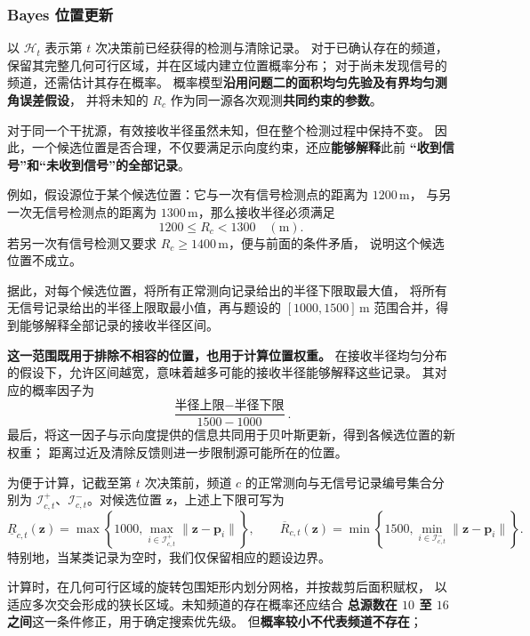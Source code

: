 \documentclass[UTF8,a4paper,12pt]{ctexart}
\begin{document}
\subsubsection{Bayes 位置更新}

以 $\mathcal H_t$ 表示第 $t$ 次决策前已经获得的检测与清除记录。
对于已确认存在的频道，保留其完整几何可行区域，并在区域内建立位置概率分布；
对于尚未发现信号的频道，还需估计其存在概率。
概率模型\textbf{沿用问题二的面积均匀先验及有界均匀测角误差假设}，
并将未知的 $R_c$ 作为同一源各次观测\textbf{共同约束的参数}。

对于同一个干扰源，有效接收半径虽然未知，但在整个检测过程中保持不变。
因此，一个候选位置是否合理，不仅要满足示向度约束，还应\textbf{能够解释}此前
\textbf{“收到信号”和“未收到信号”的全部记录}。

例如，假设源位于某个候选位置：它与一次有信号检测点的距离为 $1200\,\mathrm m$，
与另一次无信号检测点的距离为 $1300\,\mathrm m$，那么接收半径必须满足
\[
  1200\leq R_c<1300\quad (\mathrm m).
\]
若另一次有信号检测又要求 $R_c\geq1400\,\mathrm m$，便与前面的条件矛盾，
说明这个候选位置不成立。

据此，对每个候选位置，将所有正常测向记录给出的半径下限取最大值，
将所有无信号记录给出的半径上限取最小值，再与题设的 $[1000,1500]\,\mathrm m$
范围合并，得到能够解释全部记录的接收半径区间。

\textbf{这一范围既用于排除不相容的位置，也用于计算位置权重。}
在接收半径均匀分布的假设下，允许区间越宽，意味着越多可能的接收半径能够解释这些记录。
其对应的概率因子为
\[
  \frac{\text{半径上限}-\text{半径下限}}{1500-1000}.
\]
最后，将这一因子与示向度提供的信息共同用于贝叶斯更新，得到各候选位置的新权重；
距离过近及清除反馈则进一步限制源可能所在的位置。

为便于计算，记截至第 $t$ 次决策前，频道 $c$ 的正常测向与无信号记录编号集合分别为
$\mathcal I^+_{c,t}$、$\mathcal I^-_{c,t}$。对候选位置 $\boldsymbol z$，上述上下限可写为
\[
  \underline R_{c,t}(\boldsymbol z)
  =\max\!\left\{1000,\max_{i\in\mathcal I^+_{c,t}}
        \|\boldsymbol z-\boldsymbol p_i\|\right\},\qquad
  \overline R_{c,t}(\boldsymbol z)
  =\min\!\left\{1500,\min_{i\in\mathcal I^-_{c,t}}
        \|\boldsymbol z-\boldsymbol p_i\|\right\}.
\]
特别地，当某类记录为空时，我们仅保留相应的题设边界。

计算时，在几何可行区域的旋转包围矩形内划分网格，并按裁剪后面积赋权，
以适应多次交会形成的狭长区域。未知频道的存在概率还应结合
\textbf{总源数在 $10$ 至 $16$ 之间}这一条件修正，用于确定搜索优先级。
但\textbf{概率较小不代表频道不存在}；
\end{document}
